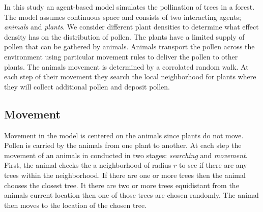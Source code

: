 In this study an agent-based model simulates the pollination of trees in a forest. The model assumes
continuous space and consists of two interacting agents; \emph{animals} and \emph{plants}.  We
consider different plant densities to determine what effect density has on the distribution of
pollen.  The plants have a limited supply of pollen that can be gathered by animals.  Animals
transport the pollen across the environment using particular movement rules to deliver the pollen to
other plants.  The animals movement is determined by a corrolated random walk.  At each step of
their movement they search the local neighborhood for plants where they will collect additional
pollen and deposit pollen.

\subsection{Movement} 
  Movement in the model is centered on the animals since plants do not move.
  Pollen is carried by the animals from one plant to another. At each step the movement of an animals
  in conducted in two stages:  {\it searching} and {\it movement}.  First, the animal checks the a
  neighborhood of radius $r$ to see if there are any trees within the neighborhood.  If there are one
  or more trees then the animal chooses the closest tree.  It there are two or more trees equidistant
  from the animals current location then one of those trees are chosen randomly.  The animal then
  moves to the location of the chosen tree.

